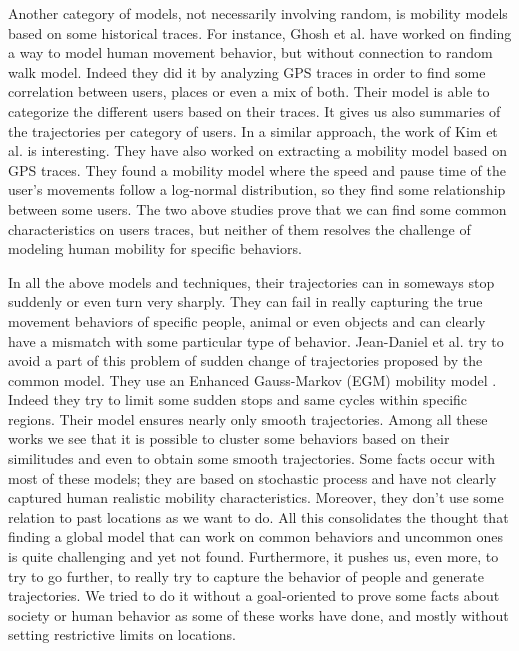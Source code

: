 \documentclass[a4]{article}
\begin{document}
Another category of models, not necessarily involving random, is mobility models based on some historical traces. For instance, Ghosh et al. \cite{ghosh2017modeling} have worked on finding a way to model human movement behavior, but without connection to random walk model. Indeed they did it by analyzing GPS traces in order to find some correlation between users, places or even a mix of both. Their model is able to categorize the different users based on their traces. It gives us also summaries of the trajectories per category of users. In a similar approach, the work of Kim et al. \cite{kim2006extracting} is interesting. They have also worked on extracting a mobility model based on GPS traces. They found a mobility model where the speed and pause time of the user's movements follow a log-normal distribution, so they find some relationship between some users. The two above studies prove that we can find some common characteristics on users traces, but neither of them resolves the challenge of modeling human mobility for specific behaviors.

In all the above models and techniques, their trajectories can in someways stop suddenly or even turn very sharply. They can fail in really capturing the true movement behaviors of specific people, animal or even objects and can clearly have a mismatch with some particular type of behavior. Jean-Daniel et al. try to avoid a part of this problem of sudden change of trajectories proposed by the common model. They use an Enhanced Gauss-Markov (EGM) mobility model \cite{biomo2014enhanced}. Indeed they try to limit some sudden stops and same cycles within specific regions. Their model ensures nearly only smooth trajectories. Among all these works we see that it is possible to cluster some behaviors based on their similitudes and even to obtain some smooth trajectories. Some facts occur with most of these models; they are based on stochastic process and have not clearly captured human realistic mobility characteristics. Moreover, they don't use some relation to past locations as we want to do. All this consolidates the thought that finding a global model that can work on common behaviors and uncommon ones is quite challenging and yet not found. Furthermore, it pushes us, even more, to try to go further, to really try to capture the behavior of people and generate trajectories. We tried to do it without a goal-oriented to prove some facts about society or human behavior as some of these works have done, and mostly without setting restrictive limits on locations.
\end{document}

